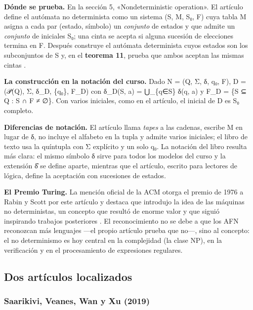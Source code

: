 \textbf{Dónde se prueba.} En la sección 5, «Nondeterministic operation». El artículo define el autómata no determinista como un sistema (S, M, S₀, F) cuya tabla M asigna a cada par (estado, símbolo) un \emph{conjunto} de estados y que admite un \emph{conjunto} de iniciales S₀; una cinta se acepta si alguna sucesión de elecciones termina en F. Después construye el autómata determinista cuyos estados son los subconjuntos de S y, en el \textbf{teorema 11}, prueba que ambos aceptan las mismas cintas \autocite{rabin1959}.

\textbf{La construcción en la notación del curso.} Dado N = (Q, Σ, δ, q₀, F), D = (𝒫(Q), Σ, δ\_D, \{q₀\}, F\_D) con δ\_D(S, a) = ⋃\_\{q∈S\} δ(q, a) y F\_D = \{S ⊆ Q : S ∩ F ≠ ∅\}. Con varios iniciales, como en el artículo, el inicial de D es S₀ completo.

\textbf{Diferencias de notación.} El artículo llama \emph{tapes} a las cadenas, escribe M en lugar de δ, no incluye el alfabeto en la tupla y admite varios iniciales; el libro de texto usa la quíntupla con Σ explícito y un solo q₀. La notación del libro resulta más clara: el mismo símbolo δ sirve para todos los modelos del curso y la extensión δ̂ se define aparte, mientras que el artículo, escrito para lectores de lógica, define la aceptación con sucesiones de estados.

\textbf{El Premio Turing.} La mención oficial de la ACM otorga el premio de 1976 a Rabin y Scott por este artículo y destaca que introdujo la idea de las máquinas no deterministas, un concepto que resultó de enorme valor y que siguió inspirando trabajos posteriores \autocite{acmturing2026}. El reconocimiento no se debe a que los AFN reconozcan más lenguajes ---el propio artículo prueba que no---, sino al concepto: el no determinismo es hoy central en la complejidad (la clase NP), en la verificación y en el procesamiento de expresiones regulares.

\hypertarget{dos-artuxedculos-localizados}{%
\subsection{Dos artículos localizados}\label{dos-artuxedculos-localizados}}

\hypertarget{saarikivi-veanes-wan-y-xu-2019}{%
\subsubsection{Saarikivi, Veanes, Wan y Xu (2019)}\label{saarikivi-veanes-wan-y-xu-2019}}

